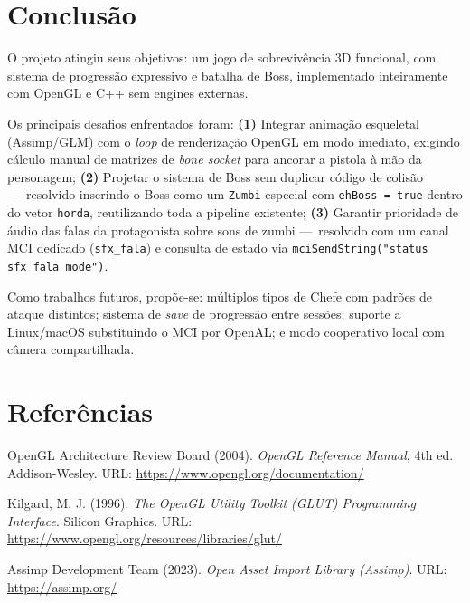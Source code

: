 \documentclass[12pt,a4paper]{article}
\begin{document}
\section{Conclusão}

O projeto atingiu seus objetivos: um jogo de sobrevivência 3D funcional,
com sistema de progressão expressivo e batalha de Boss, implementado
inteiramente com OpenGL e C++ sem engines externas.

Os principais desafios enfrentados foram:
\textbf{(1)} Integrar animação esqueletal (Assimp/GLM) com o \textit{loop}
de renderização OpenGL em modo imediato, exigindo cálculo manual de matrizes
de \textit{bone socket} para ancorar a pistola à mão da personagem;
\textbf{(2)} Projetar o sistema de Boss sem duplicar código de colisão —\
resolvido inserindo o Boss como um \texttt{Zumbi} especial com
\texttt{ehBoss = true} dentro do vetor \texttt{horda}, reutilizando toda a
pipeline existente;
\textbf{(3)} Garantir prioridade de áudio das falas da protagonista sobre
sons de zumbi —\ resolvido com um canal MCI dedicado (\texttt{sfx\_fala})
e consulta de estado via \texttt{mciSendString("status sfx\_fala mode")}.

Como trabalhos futuros, propõe-se: múltiplos tipos de Chefe com padrões de
ataque distintos; sistema de \textit{save} de progressão entre sessões;
suporte a Linux/macOS substituindo o MCI por OpenAL; e modo cooperativo
local com câmera compartilhada.

\section*{Referências}

\fontsize{12}{14}\selectfont

\noindent
OpenGL Architecture Review Board (2004). \textit{OpenGL Reference Manual},
4th ed. Addison-Wesley.
URL: \url{https://www.opengl.org/documentation/}

\vspace{6pt}\noindent
Kilgard, M. J. (1996). \textit{The OpenGL Utility Toolkit (GLUT) Programming
Interface}. Silicon Graphics.
URL: \url{https://www.opengl.org/resources/libraries/glut/}

\vspace{6pt}\noindent
Assimp Development Team (2023). \textit{Open Asset Import Library (Assimp)}.
URL: \url{https://assimp.org/}
\end{document}
